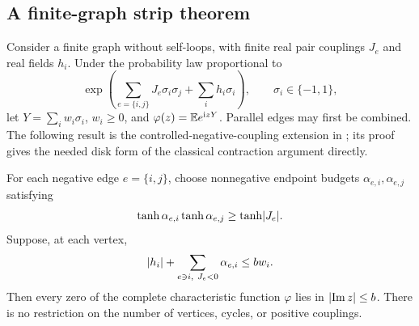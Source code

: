 \subsection{A finite-graph strip theorem}
Consider a finite graph without self-loops, with finite real pair couplings $J_e$ and real fields $h_i$. Under the probability law proportional to
\[
 \exp\left(\sum_{e=\{i,j\}}J_e\sigma_i\sigma_j+\sum_i h_i\sigma_i\right),
 \qquad \sigma_i\in\{-1,1\},
\]
let $Y=\sum_iw_i\sigma_i$, $w_i\ge0$, and $\varphi(z)=\mathbb E e^{\mathrm i zY}$. Parallel edges may first be combined. The following result is the controlled-negative-coupling extension in \cite{R1003}; its proof gives the needed disk form of the classical contraction argument directly.

\begin{theorem}\label{thm:negative-strip}
For each negative edge $e=\{i,j\}$, choose nonnegative endpoint budgets $\alpha_{e,i},\alpha_{e,j}$ satisfying
\begin{equation}\label{eq:edge-budget}
 \tanh\alpha_{e,i}\tanh\alpha_{e,j}\ge\tanh\lvert J_e\rvert.
\end{equation}
Suppose, at each vertex,
\begin{equation}\label{eq:vertex-budget}
 \lvert h_i\rvert+\sum_{e\ni i,\ J_e<0}\alpha_{e,i}\le b w_i.
\end{equation}
Then every zero of the complete characteristic function $\varphi$ lies in $\lvert\operatorname{Im} z\rvert\le b$. There is no restriction on the number of vertices, cycles, or positive couplings.
\end{theorem}
